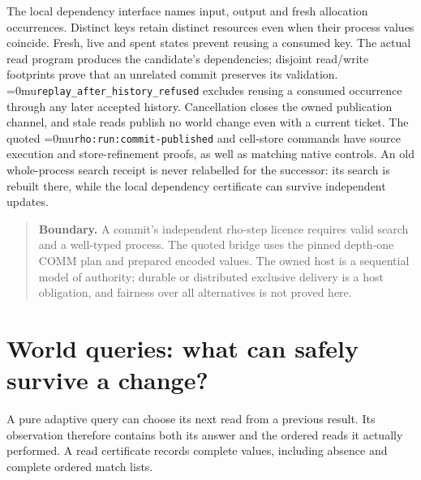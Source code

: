\documentclass[11pt,a4paper]{article}
\newcommand{\name}[1]{\textup{\Urlmuskip=0mu\relax\nolinkurl{#1}}}
\newcommand{\scope}[1]{\par\smallskip\begin{quote}\small\textbf{Boundary.} #1\end{quote}}
\newcommand{\run}{\mathsf{run}}
\begin{document}
The local dependency interface names input, output and fresh allocation
occurrences. Distinct keys retain distinct resources even when their process
values coincide. Fresh, live and spent states prevent reusing a consumed key.
The actual read program produces the candidate's dependencies; disjoint
read/write footprints prove that an unrelated commit preserves its validation.
\name{replay_after_history_refused} excludes reusing a consumed occurrence
through any later accepted history. Cancellation closes the owned publication
channel, and stale reads publish no world change even with a current ticket.
The quoted \name{rho:run:commit-published} and cell-store commands have source
execution and store-refinement proofs, as well as matching native controls.
An old whole-process search receipt is never relabelled for the successor:
its search is rebuilt there, while the local dependency certificate can survive
independent updates.

\scope{A commit's independent rho-step licence requires valid search and a
well-typed process. The quoted bridge uses the pinned depth-one COMM plan and
prepared encoded values. The owned host is a sequential model of authority;
durable or distributed exclusive delivery is a host obligation, and fairness over
all alternatives is not proved here.}

\newpage
\section{World queries: what can safely survive a change?}

A pure adaptive query can choose its next read from a previous result.
Its observation therefore contains both its answer and the ordered reads it
actually performed. A read certificate records complete values, including
absence and complete ordered match lists.

\begin{center}
\end{center}
\end{document}
